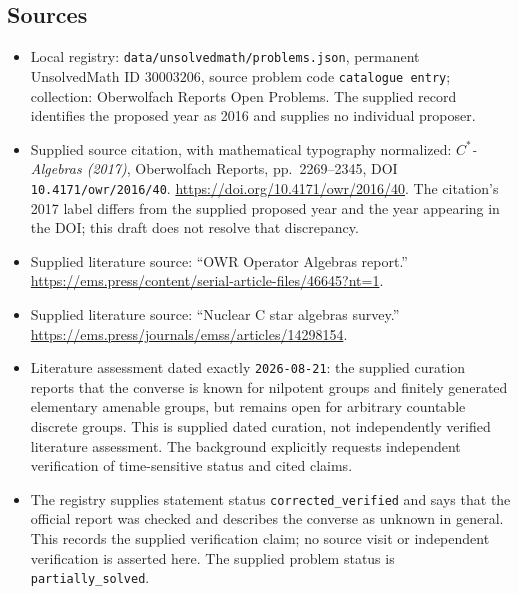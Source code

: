 \documentclass[11pt]{article}
\begin{document}
\subsection{Sources}
\begin{itemize}
\item Local registry: \texttt{data/unsolvedmath/problems.json}, permanent UnsolvedMath ID \(30003206\), source problem code \texttt{catalogue entry}; collection: Oberwolfach Reports Open Problems. The supplied record identifies the proposed year as 2016 and supplies no individual proposer.
\item Supplied source citation, with mathematical typography normalized: \emph{\(C^*\)-Algebras (2017)}, Oberwolfach Reports, pp.\ 2269--2345, DOI \texttt{10.4171/owr/2016/40}. \url{https://doi.org/10.4171/owr/2016/40}. The citation's 2017 label differs from the supplied proposed year and the year appearing in the DOI; this draft does not resolve that discrepancy.
\item Supplied literature source: ``OWR Operator Algebras report.'' \url{https://ems.press/content/serial-article-files/46645?nt=1}.
\item Supplied literature source: ``Nuclear C star algebras survey.'' \url{https://ems.press/journals/emss/articles/14298154}.
\item Literature assessment dated exactly \texttt{2026-08-21}: the supplied curation reports that the converse is known for nilpotent groups and finitely generated elementary amenable groups, but remains open for arbitrary countable discrete groups. This is supplied dated curation, not independently verified literature assessment. The background explicitly requests independent verification of time-sensitive status and cited claims.
\item The registry supplies statement status \texttt{corrected\_verified} and says that the official report was checked and describes the converse as unknown in general. This records the supplied verification claim; no source visit or independent verification is asserted here. The supplied problem status is \texttt{partially\_solved}.
\end{itemize}
\end{document}
